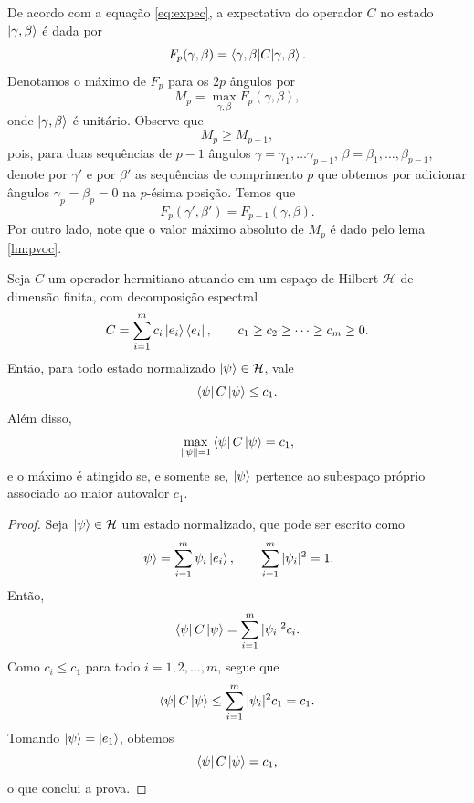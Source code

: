 De acordo com a equação \eqref{eq:expec}, a expectativa do operador $C$ no estado $\ket{\gamma, \beta}$ é dada por
\begin{equation}
    F_p(\gamma, \beta) = \braket{\gamma, \beta|C|\gamma, \beta}.
\end{equation}
Denotamos o máximo de $F_p$ para os $2p$ ângulos por
\begin{equation}\label{eq:mp}
    M_p = \max_{\gamma,\beta} F_p(\gamma, \beta),
\end{equation}
onde $\ket{\gamma, \beta}$ é unitário. Observe que
\begin{equation}
    M_p\geq M_{p-1},
\end{equation}
pois, para duas sequências de $p-1$ ângulos $\gamma=\gamma_1, \dotso \gamma_{p-1}$, $\beta=\beta_1, \dotso, \beta_{p-1}$, denote por $\gamma'$ e por $\beta'$ as sequências de comprimento $p$ que obtemos por adicionar ângulos $\gamma_p=\beta_p=0$ na $p$-ésima posição. Temos que
\begin{equation}
    F_p(\gamma', \beta') = F_{p-1}(\gamma, \beta).
\end{equation}
Por outro lado, note que o valor máximo absoluto de $M_p$ é dado pelo lema \ref{lm:pvoc}.

\begin{lemma}\label{lm:pvoc}
    Seja $C$ um operador hermitiano atuando em um espaço de Hilbert $\mathcal{H}$ de dimensão finita,
    com decomposição espectral
    $$
    C = \sum_{i=1}^m c_i \ket{e_i}\bra{e_i},
    \qquad
    c_1 \ge c_2 \ge \cdots \ge c_m \ge 0.
    $$
    Então, para todo estado normalizado $\ket{\psi} \in \mathcal{H}$, vale
    $$
    \bra{\psi} C \ket{\psi} \le c_1.
    $$
    Além disso,
    $$
    \max_{\|\psi\|=1} \bra{\psi} C \ket{\psi} = c_1,
    $$
    e o máximo é atingido se, e somente se, $\ket{\psi}$ pertence ao subespaço próprio associado
    ao maior autovalor $c_1$.

    \begin{proof}
        Seja $\ket{\psi} \in \mathcal{H}$ um estado normalizado, que pode ser escrito como
        $$
        \ket{\psi} = \sum_{i=1}^m \psi_i \ket{e_i},
        \qquad
        \sum_{i=1}^m |\psi_i|^2 = 1.
        $$
        Então,
        $$
        \bra{\psi} C \ket{\psi}
        = \sum_{i=1}^m |\psi_i|^2 c_i.
        $$
        Como $c_i \le c_1$ para todo $i=1, 2, \dotso, m$, segue que
        $$
        \bra{\psi} C \ket{\psi}
        \le \sum_{i=1}^m |\psi_i|^2 c_1
        = c_1.
        $$
        Tomando $\ket{\psi} = \ket{e_1}$, obtemos
        $$
        \bra{\psi} C \ket{\psi} = c_1,
        $$
        o que conclui a prova.
    \end{proof}
\end{lemma}


